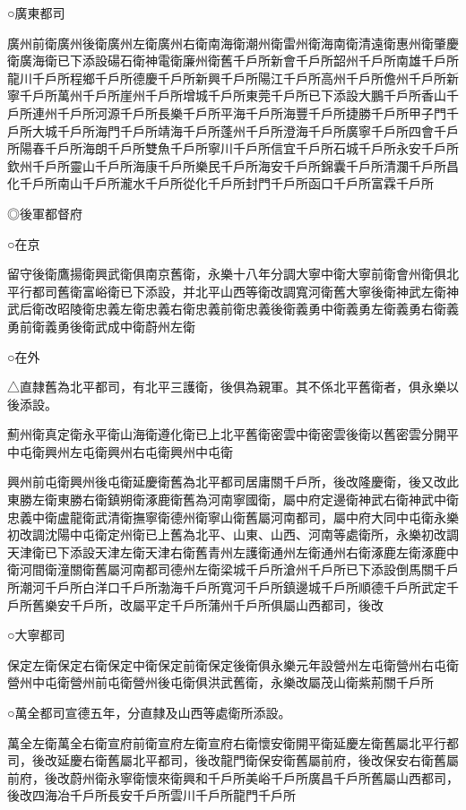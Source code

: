 ○廣東都司

廣州前衛廣州後衛廣州左衛廣州右衛南海衛潮州衛雷州衛海南衛清遠衛惠州衛肇慶衛廣海衛已下添設碭石衛神電衛廉州衛舊千戶所新會千戶所韶州千戶所南雄千戶所龍川千戶所程鄉千戶所德慶千戶所新興千戶所陽江千戶所高州千戶所儋州千戶所新寧千戶所萬州千戶所崖州千戶所增城千戶所東莞千戶所已下添設大鵬千戶所香山千戶所連州千戶所河源千戶所長樂千戶所平海千戶所海豐千戶所捷勝千戶所甲子門千戶所大城千戶所海門千戶所靖海千戶所蓬州千戶所澄海千戶所廣寧千戶所四會千戶所陽春千戶所海朗千戶所雙魚千戶所寧川千戶所信宜千戶所石城千戶所永安千戶所欽州千戶所靈山千戶所海康千戶所樂民千戶所海安千戶所錦囊千戶所清瀾千戶所昌化千戶所南山千戶所瀧水千戶所從化千戶所封門千戶所函口千戶所富霖千戶所

◎後軍都督府

○在京

留守後衛鷹揚衛興武衛俱南京舊衛，永樂十八年分調大寧中衛大寧前衛會州衛俱北平行都司舊衛富峪衛已下添設，并北平山西等衛改調寬河衛舊大寧後衛神武左衛神武后衛改昭陵衛忠義左衛忠義右衛忠義前衛忠義後衛義勇中衛義勇左衛義勇右衛義勇前衛義勇後衛武成中衛蔚州左衛

○在外

△直隸舊為北平都司，有北平三護衛，後俱為親軍。其不係北平舊衛者，俱永樂以後添設。

薊州衛真定衛永平衛山海衛遵化衛已上北平舊衛密雲中衛密雲後衛以舊密雲分開平中屯衛興州左屯衛興州右屯衛興州中屯衛

興州前屯衛興州後屯衛延慶衛舊為北平都司居庸關千戶所，後改隆慶衛，後又改此東勝左衛東勝右衛鎮朔衛涿鹿衛舊為河南寧國衛，屬中府定邊衛神武右衛神武中衛忠義中衛盧龍衛武清衛撫寧衛德州衛寧山衛舊屬河南都司，屬中府大同中屯衛永樂初改調沈陽中屯衛定州衛已上舊為北平、山東、山西、河南等處衛所，永樂初改調天津衛已下添設天津左衛天津右衛舊青州左護衛通州左衛通州右衛涿鹿左衛涿鹿中衛河間衛潼關衛舊屬河南都司德州左衛梁城千戶所滄州千戶所已下添設倒馬關千戶所潮河千戶所白洋口千戶所渤海千戶所寬河千戶所鎮邊城千戶所順德千戶所武定千戶所舊樂安千戶所，改屬平定千戶所蒲州千戶所俱屬山西都司，後改

○大寧都司

保定左衛保定右衛保定中衛保定前衛保定後衛俱永樂元年設營州左屯衛營州右屯衛營州中屯衛營州前屯衛營州後屯衛俱洪武舊衛，永樂改屬茂山衛紫荊關千戶所

○萬全都司宣德五年，分直隸及山西等處衛所添設。

萬全左衛萬全右衛宣府前衛宣府左衛宣府右衛懷安衛開平衛延慶左衛舊屬北平行都司，後改延慶右衛舊屬北平都司，後改龍門衛保安衛舊屬前府，後改保安右衛舊屬前府，後改蔚州衛永寧衛懷來衛興和千戶所美峪千戶所廣昌千戶所舊屬山西都司，後改四海冶千戶所長安千戶所雲川千戶所龍門千戶所

